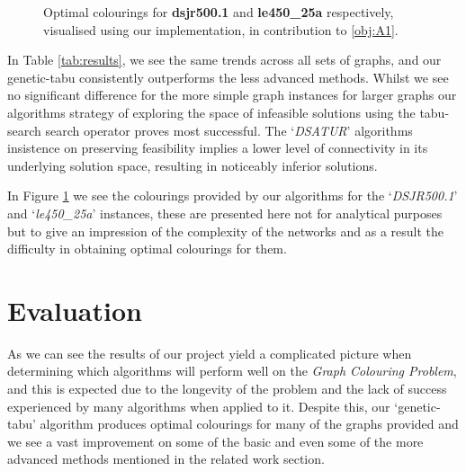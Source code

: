 \documentclass[12pt,a4paper]{article}
\begin{document}
\begin{figure}[htb!]
    \caption{Optimal colourings for \textbf{dsjr500.1} and \textbf{le450\_25a} respectively, visualised using our implementation, in contribution to \ref{obj:A1}.}
    \vspace*{-0.5cm}
    \label{fig:colourings}
\end{figure}

\par In Table \ref{tab:results}, we see the same trends across all sets of graphs, and our genetic-tabu consistently outperforms the less advanced methods. Whilst we see no significant difference for the more simple graph instances for larger graphs our algorithms strategy of exploring the space of infeasible solutions using the tabu-search search operator proves most successful. The `\textit{DSATUR}' algorithms insistence on preserving feasibility implies a lower level of connectivity in its underlying solution space, resulting in noticeably inferior solutions.
\par In Figure \ref{fig:colourings} we see the colourings provided by our algorithms for the `\textit{DSJR500.1}' and `\textit{le450\_25a}' instances, these are presented here not for analytical purposes but to give an impression of the complexity of the networks and as a result the difficulty in obtaining optimal colourings for them.

\section{Evaluation}
\par As we can see the results of our project yield a complicated picture when determining which algorithms will perform well on the \textit{Graph Colouring Problem}, and this is expected due to the longevity of the problem and the lack of success experienced by many algorithms when applied to it.  Despite this, our `genetic-tabu' algorithm produces optimal colourings for many of the graphs provided and we see a vast improvement on some of the basic and even some of the more advanced methods mentioned in the related work section. 
\end{document}
